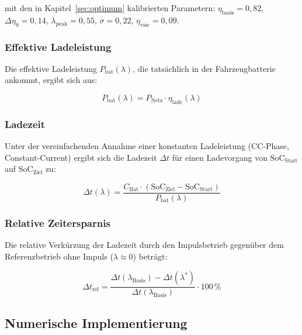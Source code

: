 ﻿\documentclass[a4paper,12pt]{article}
\begin{document}
mit den in Kapitel~\ref{sec:optimum} kalibrierten Parametern:
$\eta_\text{basis} = 0{,}82$, $\Delta\eta_\text{S} = 0{,}14$,
$\lambda_\text{peak} = 0{,}55$, $\sigma = 0{,}22$,
$\eta_\text{visc} = 0{,}09$.

\subsubsection{Effektive Ladeleistung}

Die effektive Ladeleistung $P_\text{bat}(\lambda)$, die tatsächlich in
der Fahrzeugbatterie ankommt, ergibt sich aus:

\begin{equation}
  P_\text{bat}(\lambda) = P_\text{Netz} \cdot \eta_\text{lade}(\lambda)
  \label{eq:pbat}
\end{equation}

\subsubsection{Ladezeit}

Unter der vereinfachenden Annahme einer konstanten Ladeleistung
(CC-Phase, Constant-Current) ergibt sich die Ladezeit $\Delta t$ für
einen Ladevorgang von $\text{SoC}_\text{Start}$ auf $\text{SoC}_\text{Ziel}$ zu:

\begin{equation}
  \Delta t(\lambda) = \frac{C_\text{Bat}
    \cdot (\text{SoC}_\text{Ziel} - \text{SoC}_\text{Start})}
    {P_\text{bat}(\lambda)}
  \label{eq:ladezeit}
\end{equation}

\subsubsection{Relative Zeitersparnis}

Die relative Verkürzung der Ladezeit durch den Impulsbetrieb gegenüber
dem Referenzbetrieb ohne Impuls ($\lambda \approx 0$) beträgt:

\begin{equation}
  \Delta t_\text{rel} = \frac{\Delta t(\lambda_\text{Basis})
    - \Delta t(\lambda^*)}{\Delta t(\lambda_\text{Basis})} \cdot 100\,\%
  \label{eq:zeitersparnis}
\end{equation}

\subsection{Numerische Implementierung}
\end{document}

